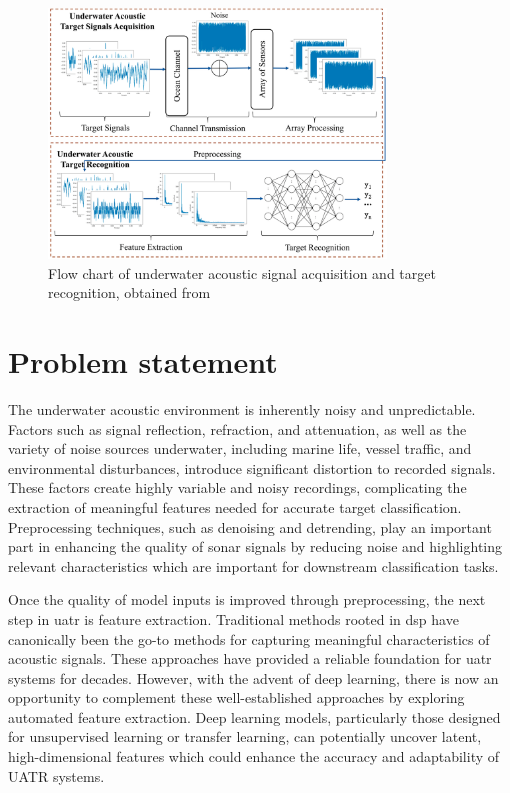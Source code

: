 \begin{figure}[htbp]
\centering 
\includegraphics[width=0.8\textwidth]{img/ch1/flowchart.png} 
\caption{Flow chart of underwater acoustic signal acquisition and target recognition, obtained from \cite[Fig.~1]{luo_survey_2023}} 
\label{fig:luo-flowchart} 
\end{figure}

\section{Problem statement}

The underwater acoustic environment is inherently noisy and unpredictable. Factors such as signal reflection, refraction, and attenuation, as well as the variety of noise sources underwater, including marine life, vessel traffic, and environmental disturbances, introduce significant distortion to recorded signals. These factors create highly variable and noisy recordings, complicating the extraction of meaningful features needed for accurate target classification. Preprocessing techniques, such as denoising and detrending, play an important part in enhancing the quality of sonar signals by reducing noise and highlighting relevant characteristics which are important for downstream classification tasks.

Once the quality of model inputs is improved through preprocessing, the next step in \acrshort{uatr} is feature extraction. Traditional methods rooted in \acrshort{dsp} have canonically been the go-to methods for capturing meaningful characteristics of acoustic signals. These approaches have provided a reliable foundation for \acrshort{uatr} systems for decades. However, with the advent of deep learning, there is now an opportunity to complement these well-established approaches by exploring automated feature extraction. Deep learning models, particularly those designed for unsupervised learning or transfer learning, can potentially uncover latent, high-dimensional features which could enhance the accuracy and adaptability of UATR systems.

